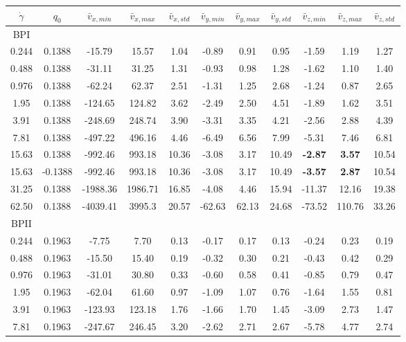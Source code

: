 \documentclass[aps,pre,reprint,superscriptaddress]{revtex4}
\begin{document}
\appendix*

\begin{table}
\begin{tabular}{|c|| c || c |c |c||c| c| c||c| c| c|}
\hline
$\dot{\gamma}$ & $q_0$ & $\bar{v}_{x,min}$ & $\bar{v}_{x,max}$ & $\bar{v}_{x,std}$ & $\bar{v}_{y,min}$ & $\bar{v}_{y,max}$ & $\bar{v}_{y,std}$ & $\bar{v}_{z,min}$ & $\bar{v}_{z,max}$ & $\bar{v}_{z,std}$ \\
\hline
BPI \\
\hline
0.244 & 0.1388 &-15.79 &15.57 &1.04 &-0.89 &0.91 &0.95 &-1.59 &1.19 &1.27 \\
0.488 &0.1388 &-31.11 &31.25 &1.31 &-0.93 &0.98 &1.28 &-1.62 &1.10 &1.40 \\
0.976 &0.1388 &-62.24 &62.37 &2.51 &-1.31 &1.25 &2.68 &-1.24 &0.87 &2.65 \\
1.95 & 0.1388 &-124.65 &124.82 &3.62&  -2.49 &2.50 &4.51 &-1.89 & 1.62 &3.51 \\
3.91 &0.1388 &-248.69 &248.74 &3.90&  -3.31 &3.35 &4.21 &-2.56 & 2.88 &4.39 \\
7.81 &0.1388 &-497.22 &496.16 &4.46 &-6.49 &6.56 &7.99 &-5.31 & 7.46 &6.81 \\ 
15.63 &0.1388 &-992.46 &993.18 &10.36 &-3.08 &3.17 &10.49 &\bf{-2.87} & \bf{3.57} &10.54 \\
15.63 &-0.1388 &-992.46 &993.18 &10.36 &-3.08 &3.17 &10.49 &\bf{-3.57} & \bf{2.87} &10.54 \\
31.25 &0.1388 & -1988.36 &1986.71 &16.85 &-4.08 &4.46 &15.94 &-11.37 & 12.16 &19.38\\
62.50 &0.1388 & -4039.41 &3995.3  & 20.57 & -62.63 & 62.13 & 24.68 &-73.52 & 110.76 & 33.26 \\
\hline
BPII \\
\hline
0.244 &0.1963 &-7.75 &7.70 &0.13 &-0.17 &0.17 &0.13 &-0.24 &0.23 &0.19 \\
0.488 &0.1963 &-15.50 &15.40 &0.19 &-0.32 &0.30 &0.21 &-0.43 &0.42 &0.29 \\
0.976 &0.1963 &-31.01 &30.80 &0.33 &-0.60 &0.58 &0.41 &-0.85 &0.79 &0.47 \\
1.95 & 0.1963 &-62.04  &61.60 & 0.97 & -1.09 &1.07 & 0.76 & -1.64 & 1.55 & 0.81\\
3.91 & 0.1963 &-123.93 &123.18 & 1.76 &-1.66 &1.70 & 1.45 &-3.09& 2.73 &1.47\\
7.81 &0.1963  &-247.67 &246.45 & 3.20 &-2.62 &2.71 & 2.67 &-5.78 & 4.77 &2.74\\

\end{tabular}
\end{table}
\end{document}
